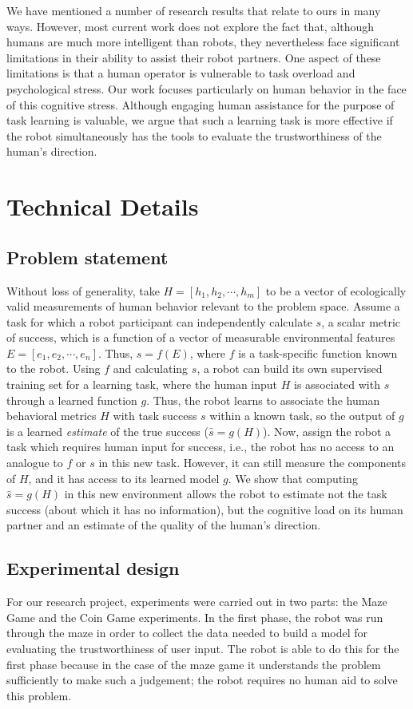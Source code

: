 \documentclass{sig-alternate}
\begin{document}
We have mentioned a number of research results that relate to ours in
many ways.  However, most current work does not explore the fact that,
although humans are much more intelligent than robots, they
nevertheless face significant limitations in their ability to assist
their robot partners.  One aspect of these limitations is that a human
operator is vulnerable to task overload and psychological stress.  Our
work focuses particularly on human behavior in the face of this
cognitive stress.  Although engaging human assistance for the purpose
of task learning is valuable, we argue that such a learning task is
more effective if the robot simultaneously has the tools to evaluate
the trustworthiness of the human's direction.

\section{Technical Details}
\subsection{Problem statement}
Without loss of generality, take $H=[h_1,h_2,\cdots,h_m]$ to be a
vector of ecologically valid measurements of human behavior relevant to
the problem space.  Assume a task for which a robot participant can
independently calculate $s$, a scalar metric of success, which is a
function of a vector of measurable environmental features
$E=[e_1,e_2,\cdots,e_n]$.  Thus, $s = f(E)$, where $f$ is a
task-specific function known to the robot.  Using $f$ and calculating
$s$, a robot can build its own supervised training set for a learning
task, where the human input $H$ is associated with $s$ through a
learned function $g$.  Thus, the robot learns to associate the human
behavioral metrics $H$ with task success $s$ within a known task, so
the output of $g$ is a learned \emph{estimate} of the true success
($\hat{s}=g(H)$).  Now, assign the robot a task which requires human
input for success, i.e., the robot has no access to an analogue to $f$
or $s$ in this new task.  However, it can still measure the components
of $H$, and it has access to its learned model $g$.  We show that
computing $\hat{s}=g(H)$ in this new environment allows the robot to
estimate not the task success (about which it has no information), but
the cognitive load on its human partner and an estimate of the quality
of the human's direction.
\subsection{Experimental design}
For our research project, experiments were carried out in two parts:
the Maze Game and the Coin Game experiments. In the first phase, the
robot was run through the maze in order to collect the data needed to
build a model for evaluating the trustworthiness of user input. The
robot is able to do this for the first phase because in the case of
the maze game it understands the problem sufficiently to make such a
judgement; the robot requires no human aid to solve this problem.
\end{document}
